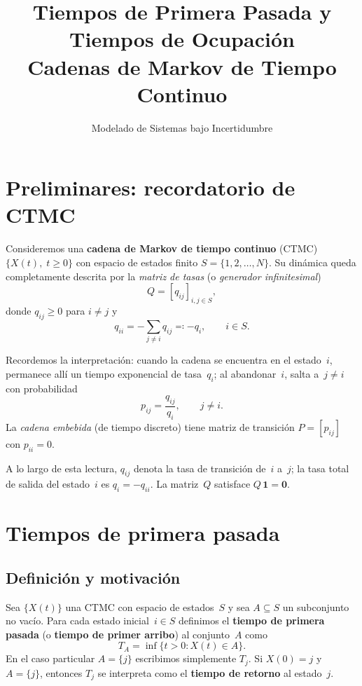 \documentclass[11pt, letterpaper]{article}
\title{Tiempos de Primera Pasada y Tiempos de Ocupación\\[4pt]
       {\large Cadenas de Markov de Tiempo Continuo}}
\author{Modelado de Sistemas bajo Incertidumbre}
\date{}
\begin{document}
\maketitle

\tableofcontents
\newpage

\section{Preliminares: recordatorio de CTMC}

Consideremos una \textbf{cadena de Markov de tiempo continuo} (CTMC)
$\{X(t),\; t\ge 0\}$ con espacio de estados finito $S=\{1,2,\ldots,N\}$.
Su dinámica queda completamente descrita por la \emph{matriz de tasas}
(o \emph{generador infinitesimal})
\[
  Q = [q_{ij}]_{i,j\in S},
\]
donde $q_{ij}\ge 0$ para $i\ne j$ y
\[
  q_{ii} = -\sum_{j\ne i} q_{ij} \eqqcolon -q_i, \qquad i\in S.
\]

Recordemos la interpretación: cuando la cadena se encuentra en el
estado~$i$, permanece allí un tiempo exponencial de tasa~$q_i$; al
abandonar~$i$, salta a~$j\ne i$ con probabilidad
\[
  p_{ij} = \frac{q_{ij}}{q_i}, \qquad j\ne i.
\]
La \emph{cadena embebida} (de tiempo discreto) tiene matriz de
transición $P=[p_{ij}]$ con $p_{ii}=0$.

\begin{notabox}[Notación]
  A lo largo de esta lectura, $q_{ij}$ denota la tasa de transición
  de~$i$ a~$j$; la tasa total de salida del estado~$i$ es
  $q_i = -q_{ii}$.  La matriz~$Q$ satisface $Q\,\mathbf{1}=\mathbf{0}$.
\end{notabox}

\section{Tiempos de primera pasada}

\subsection{Definición y motivación}

\begin{definicionbox}
  Sea $\{X(t)\}$ una CTMC con espacio de estados~$S$ y sea
  $A\subseteq S$ un subconjunto no vacío.  Para cada estado
  inicial~$i\in S$ definimos el \textbf{tiempo de primera pasada}
  (o \textbf{tiempo de primer arribo}) al conjunto~$A$ como
  \[
    T_A = \inf\{t > 0 : X(t) \in A\}.
  \]
  En el caso particular $A=\{j\}$ escribimos simplemente $T_j$.
  Si $X(0)=j$ y $A=\{j\}$, entonces $T_j$ se interpreta como el
  \textbf{tiempo de retorno} al estado~$j$.
\end{definicionbox}
\end{document}
